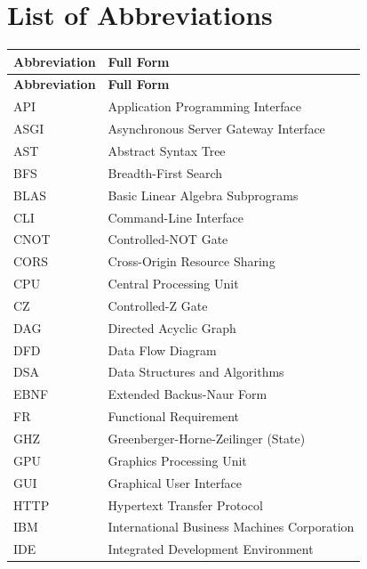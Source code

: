 
\chapter*{List of Abbreviations}

\begin{longtable}{|p{3cm}|p{10cm}|}
\hline
\textbf{Abbreviation} & \textbf{Full Form} \\
\hline
\endfirsthead

\hline
\textbf{Abbreviation} & \textbf{Full Form} \\
\hline
\endhead

\hline
\endfoot

API & Application Programming Interface \\
\hline
ASGI & Asynchronous Server Gateway Interface \\
\hline
AST & Abstract Syntax Tree \\
\hline
BFS & Breadth-First Search \\
\hline
BLAS & Basic Linear Algebra Subprograms \\
\hline
CLI & Command-Line Interface \\
\hline
CNOT & Controlled-NOT Gate \\
\hline
CORS & Cross-Origin Resource Sharing \\
\hline
CPU & Central Processing Unit \\
\hline
CZ & Controlled-Z Gate \\
\hline
DAG & Directed Acyclic Graph \\
\hline
DFD & Data Flow Diagram \\
\hline
DSA & Data Structures and Algorithms \\
\hline
EBNF & Extended Backus-Naur Form \\
\hline
FR & Functional Requirement \\
\hline
GHZ & Greenberger-Horne-Zeilinger (State) \\
\hline
GPU & Graphics Processing Unit \\
\hline
GUI & Graphical User Interface \\
\hline
HTTP & Hypertext Transfer Protocol \\
\hline
IBM & International Business Machines Corporation \\
\hline
IDE & Integrated Development Environment \\

\end{longtable}
